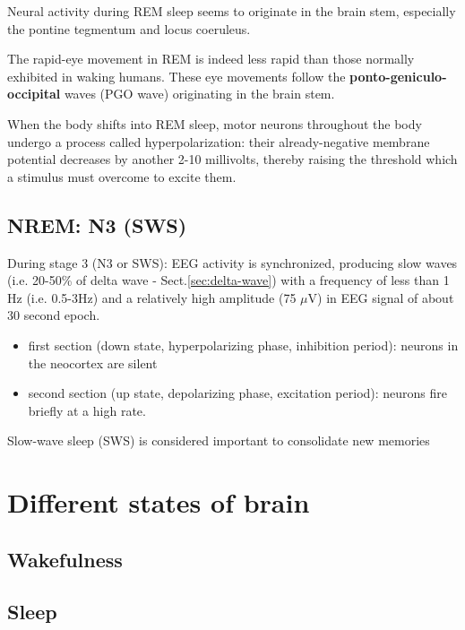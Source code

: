 Neural activity during REM sleep seems to originate in the brain stem,
especially the pontine tegmentum and locus coeruleus.

The rapid-eye movement in REM is indeed less rapid than those normally exhibited
in waking humans. These eye movements follow the {\bf ponto-geniculo-occipital}
waves (PGO wave) originating in the brain stem.

When the body shifts into REM sleep, motor neurons throughout the body undergo a
process called hyperpolarization: their already-negative membrane potential
decreases by another 2-10 millivolts, thereby raising the threshold which a
stimulus must overcome to excite them.


\subsection{NREM: N3 (SWS)}

During stage 3 (N3 or SWS): EEG activity is synchronized, producing slow waves
(i.e. 20-50\% of delta wave - Sect.\ref{sec:delta-wave}) with a frequency of less
than 1 Hz (i.e. 0.5-3Hz) and a relatively high amplitude (75 $\mu$V) in EEG
signal of about 30 second epoch.

  \begin{itemize}
    \item first section (down state, hyperpolarizing phase, inhibition period): 
    neurons in the neocortex are silent
    
    \item second section (up state, depolarizing phase, excitation period): 
    neurons fire briefly at a high rate. 
  \end{itemize}

Slow-wave sleep (SWS) is considered important to consolidate new memories


\section{Different states of brain}
\label{sec:state-brain}

\subsection{Wakefulness}
\label{sec:state-brain-awake}

\subsection{Sleep}
\label{sec:state-brain-sleep}
\label{sec:NREM}

